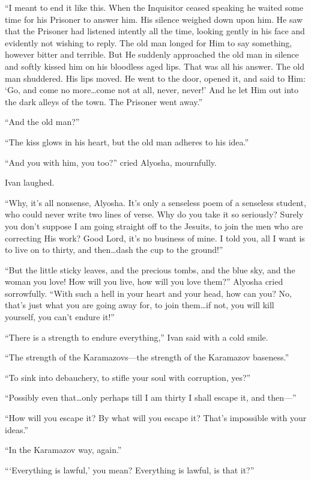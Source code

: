 ``I meant to end it like this. When the Inquisitor ceased speaking he
waited some time for his Prisoner to answer him. His silence weighed
down upon him. He saw that the Prisoner had listened intently all the
time, looking gently in his face and evidently not wishing to reply.
The old man longed for Him to say something, however bitter and
terrible. But He suddenly approached the old man in silence and softly
kissed him on his bloodless aged lips. That was all his answer. The
old man shuddered. His lips moved. He went to the door, opened it, and
said to Him: `Go, and come no more\ldots come not at all, never,
never!' And he let Him out into the dark alleys of the town. The
Prisoner went away.''

``And the old man?''

``The kiss glows in his heart, but the old man adheres to his idea.''

``And you with him, you too?'' cried Alyosha, mournfully.

Ivan laughed.

``Why, it's all nonsense, Alyosha. It's only a senseless poem of a
senseless student, who could never write two lines of verse. Why do
you take it so seriously? Surely you don't suppose I am going straight
off to the Jesuits, to join the men who are correcting His work? Good
Lord, it's no business of mine. I told you, all I want is to live on
to thirty, and then\ldots dash the cup to the ground!''

``But the little sticky leaves, and the precious tombs, and the blue
sky, and the woman you love! How will you live, how will you love
them?'' Alyosha cried sorrowfully. ``With such a hell in your heart
and your head, how can you? No, that's just what you are going away
for, to join them\ldots if not, you will kill yourself, you can't
endure it!''

``There is a strength to endure everything,'' Ivan said with a cold
smile.

``The strength of the Karamazovs---the strength of the Karamazov
baseness.''

``To sink into debauchery, to stifle your soul with
corruption, yes?''

``Possibly even that\ldots only perhaps till I am thirty I shall
escape it, and then---''

``How will you escape it? By what will you escape it? That's
impossible with your ideas.''

``In the Karamazov way, again.''

```Everything is lawful,' you mean? Everything is lawful, is that
it?''

